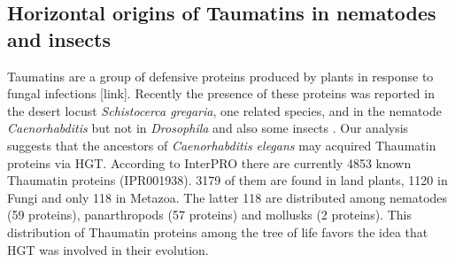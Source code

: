 \subsection{Horizontal origins of Taumatins in nematodes and insects}
Taumatins are a group of defensive proteins produced by plants in response to
fungal infections [link]. Recently the presence of these proteins was reported
in the desert locust \textit{Schistocerca gregaria}, one related species, and
in the nematode \textit{Caenorhabditis} but not in \textit{Drosophila} and
also some insects \cite{Brandazza2004}. Our analysis suggests that the ancestors of
\textit{Caenorhabditis elegans} may acquired Thaumatin proteins via HGT.
According to InterPRO \cite{Finn2017} there are currently 4853 known Thaumatin
proteins (IPR001938). 3179 of them are found in land plants, 1120 in Fungi and
only 118 in Metazoa. The latter 118 are distributed among nematodes (59
proteins), panarthropods (57 proteins) and mollusks (2 proteins). This
distribution of Thaumatin proteins among the tree of life favors the idea that
HGT was involved in their evolution.
